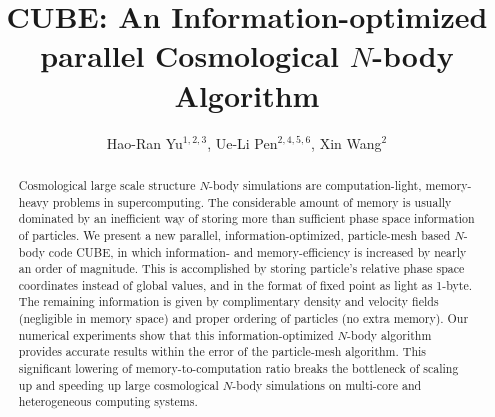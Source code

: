 \documentclass[10pt,twocolumn,preprint]{emulateapj}
\begin{document}
\title{CUBE: An Information-optimized parallel Cosmological $N$-body Algorithm}
\author{
Hao-Ran Yu$^{1,2,3}$,
Ue-Li Pen$^{2,4,5,6}$,
Xin Wang$^{2}$
}



\begin{abstract}
Cosmological large scale structure $N$-body simulations are computation-light, memory-heavy problems in supercomputing. The considerable amount of memory is usually dominated by an inefficient way of storing more than sufficient phase space information of particles. We present a new parallel, information-optimized, particle-mesh based $N$-body code CUBE, in which information- and memory-efficiency is increased by nearly an order of magnitude. This is accomplished by storing particle's relative phase space coordinates instead of global values, and in the format of fixed point as light as 1-byte. The remaining information is given by complimentary density and velocity fields (negligible in memory space) and proper ordering of particles (no extra memory). Our numerical experiments show that this information-optimized $N$-body algorithm provides accurate results within the error of the particle-mesh algorithm. This significant lowering of memory-to-computation ratio breaks the bottleneck of scaling up and speeding up large cosmological $N$-body simulations on multi-core and heterogeneous computing systems.

\end{abstract}

\keywords{}

\maketitle
\end{document}
